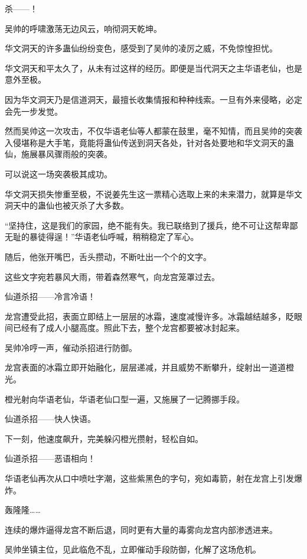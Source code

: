 
\begin{this_body}



杀——！

吴帅的呼啸激荡无边风云，响彻洞天乾坤。

华文洞天的许多蛊仙纷纷变色，感受到了吴帅的凌厉之威，不免惊惶担忧。

华文洞天和平太久了，从未有过这样的经历。即便是当代洞天之主华语老仙，也是意外至极。

因为华文洞天乃是信道洞天，最擅长收集情报和种种线索。一旦有外来侵略，必定会先一步发觉。

然而吴帅这一次攻击，不仅华语老仙等人都蒙在鼓里，毫不知情，而且吴帅的突袭入侵堪称是大手笔，竟能将蛊仙传送到洞天各处，针对各处要地和华文洞天的蛊仙，施展暴风骤雨般的突袭。

可以说这一场突袭极其成功。

华文洞天损失惨重至极，不说姜先生这一票精心选取上来的未来潜力，就算是华文洞天中的蛊仙也被灭杀了大多数。

“坚持住，这是我们的家园，绝不能有失。我已联络到了援兵，绝不可让这帮卑鄙无耻的暴徒得逞！”华语老仙呼喊，稍稍稳定了军心。

随后，他张开嘴巴，舌头攒动，不断吐出一个个的文字。

这些文字宛若暴风大雨，带着森然寒气，向龙宫笼罩过去。

仙道杀招——冷言冷语！

龙宫遭受此招，表面立即结上一层层的冰霜，速度减慢许多。冰霜越结越多，眨眼间已经有了成人小腿高度。照此下去，整个龙宫都要被冰封起来。

吴帅冷哼一声，催动杀招进行防御。

龙宫表面的冰霜立即开始融化，层层递减，并且威势不断攀升，绽射出一道道橙光。

橙光射向华语老仙，华语老仙口型一遍，又施展了一记腾挪手段。

仙道杀招——快人快语。

下一刻，他速度飙升，完美躲闪橙光攒射，轻松自如。

仙道杀招——恶语相向！

华语老仙再次从口中喷吐字潮，这些紫黑色的字句，宛如毒箭，射在龙宫上引发爆炸。

轰隆隆……

连续的爆炸逼得龙宫不断后退，同时更有大量的毒雾向龙宫内部渗透进来。

吴帅坐镇主位，见此临危不乱，立即催动手段防御，化解了这场危机。


\end{this_body}
